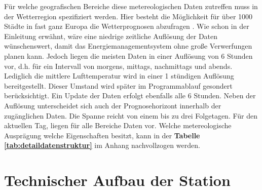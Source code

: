 Für welche geografischen Bereiche diese metereologischen Daten zutreffen muss in der Wetterregion spezifiziert werden. Hier besteht die Möglichkeit für über 1000 Städte in fast ganz Europa die Wetterprognosen abzufragen \cite[S. 27-38]{HKWDoc}. Wie schon in der Einleitung erwähnt, wäre eine niedrige zeitliche Auflösung der Daten wünschenswert, damit das Energiemanagementsystem ohne große Verwerfungen planen kann. Jedoch liegen die meisten Daten in einer Auflösung von 6 Stunden vor, d.h. für ein Intervall von morgens, mittags, nachmittags und abends. Lediglich die mittlere Lufttemperatur wird in einer 1 stündigen Auflösung bereitgestellt. Dieser Umstand wird später im Programmablauf gesondert berücksichtigt. Ein Update der Daten erfolgt ebenfalls alle 6 Stunden. Neben der Auflösung unterscheidet sich auch der Prognosehorizont innerhalb der zugänglichen Daten. Die Spanne reicht von einem bis zu drei Folgetagen. Für den aktuellen Tag, liegen für alle Bereiche Daten vor. Welche metereologische Ausprägung welche Eigenschaften besitzt, kann in der \textbf{Tabelle \ref{tab:detaildatenstruktur}} im Anhang nachvollzogen werden.    
\section{Technischer Aufbau der Station}
